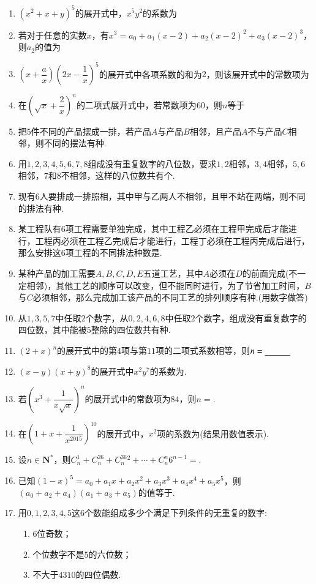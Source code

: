 \documentclass[marginline,noindent,answers,adobefonts]{BHCexam}
\begin{document}
\begin{enumerate}[1)]
\item $ \left(x^2+x+y\right)^5 $的展开式中，$ x^5y^2 $的系数为\xx
{}
\item 若对于任意的实数$ x $，有$ x^3=a_0+a_1(x-2)+a_2(x-2)^2+a_3(x-2)^3 $，则$ a_2 $的值为\xx
{}
\item $ \left(x+\dfrac{a}{x}\right)\left(2x-\dfrac{1}{x}\right)^5 $的展开式中各项系数的和为$ 2 $，则该展开式中的常数项为\xx
{}
\item 在$ \left(\sqrt{x}+\dfrac{2}{x}\right)^n $的二项式展开式中，若常数项为$ 60 $，则$ n $等于\xx
{}
\item 把$ 5 $件不同的产品摆成一排，若产品$ A $与产品$ B $相邻，且产品$ A $不与产品$ C $相邻，则不同的摆法有\tk 种.
\item 用$ 1,2,3,4,5,6,7,8 $组成没有重复数字的八位数，要求$ 1,2 $相邻，$ 3,4 $相邻，$ 5,6 $相邻，$ 7\text{和}8 $不相邻，这样的八位数共有\tk 个.
\item 现有$ 6 $人要排成一排照相，其中甲与乙两人不相邻，且甲不站在两端，则不同的排法有\tk 种.
\item 某工程队有$ 6 $项工程需要单独完成，其中工程乙必须在工程甲完成后才能进行，工程丙必须在工程乙完成后才能进行，工程丁必须在工程丙完成后进行，那么安排这$ 6 $项工程的不同排法种数是\tk.
\item 某种产品的加工需要$ A,B,C,D,E $五道工艺，其中$ A $必须在$ D $的前面完成(不一定相邻)，其他工艺的顺序可以改变，但不能同时进行，为了节省加工时间，$ B $与$ C $必须相邻，那么完成加工该产品的不同工艺的排列顺序有\tk 种.(用数字做答)
\item 从$ 1,3,5,7 $中任取$ 2 $个数字，从$ 0,2,4,6,8$中任取$ 2 $个数字，组成没有重复数字的四位数，其中能被$ 5 $整除的四位数共有\tk 种.
\item $ \left(2+x\right)^n $的展开式中的第$ 4 $项与第$ 11 $项的二项式系数相等，则$ n=\underline{\hspace{3em}} $
\item $ (x-y)(x+y)^8 $的展开式中$ x^2y^7 $的系数为\tk.
\item 若$ \left(x^3+\dfrac{1}{x\sqrt{x}}\right)^n $的展开式中的常数项为$ 84 $，则$ n =$\tk.
\item 在$ \left(1+x+\dfrac{1}{x^{2015}}\right) ^{10}$的展开式中，$ x^2 $项的系数为\tk(结果用数值表示).
\item 设$ n\in \mathbf{N^*} $，则$ C_n^1+C_n^26+C_n^36^2+\cdots+C_n^n6^{n-1} =$\tk.
\item 已知$ (1-x)^5=a_0+a_1x+a_2x^2+a_3x^3+a_4x^4+a_5x^5 $，则$ (a_0+a_2+a_4)(a_1+a_3+a_5) $的值等于\tk.
\item 用$0,1,2,3,4,5$这$ 6 $个数能组成多少个满足下列条件的无重复的数字:
\begin{enumerate}[(1 )]
\item $ 6 $位奇数；
\item 个位数字不是$ 5 $的六位数；
\item 不大于$4310$的四位偶数.
\end{enumerate}
\end{enumerate}
\end{document}
